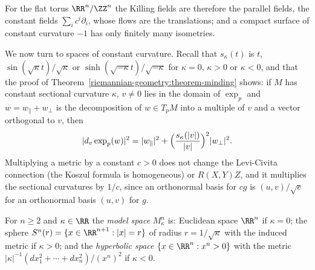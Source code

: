 For the flat torus $\RR^n/\ZZ^n$ the Killing fields are therefore the parallel fields, the constant fields $\sum_ic^i\partial_i$, whose flows are the translations; and a
compact surface of constant curvature $-1$ has only finitely many isometries.

We now turn to spaces of constant curvature. Recall that $s_\kappa(t)$ is $t$, $\sin(\sqrt\kappa t)/\sqrt\kappa$ or $\sinh(\sqrt{-\kappa}t)/\sqrt{-\kappa}$ for
$\kappa = 0$, $\kappa > 0$ or $\kappa < 0$, and that the proof of Theorem~\ref{riemannian-geometry:theorem-minding} shows: if $M$ has constant sectional curvature $\kappa$,
$v \neq 0$ lies in the domain of $\exp_p$ and $w = w_\parallel + w_\perp$ is the decomposition of $w \in T_pM$ into a multiple of $v$ and a vector orthogonal to $v$, then
\begin{equation}\label{riemannian-geometry:equation-exp-constant-curvature}
|d_v\exp_p(w)|^2 = |w_\parallel|^2 + \Bigl(\frac{s_\kappa(|v|)}{|v|}\Bigr)^2|w_\perp|^2.
\end{equation}
Multiplying a metric by a constant $c > 0$ does not change the Levi-Civita connection (the Koszul formula is homogeneous) or $R(X, Y)Z$, and it multiplies the
sectional curvatures by $1/c$, since an orthonormal basis for $cg$ is $(u, v)/\sqrt c$ for an orthonormal basis $(u, v)$ for $g$.

\begin{definition}\label{riemannian-geometry:definition-model-spaces}
For $n \geq 2$ and $\kappa \in \RR$ the \emph{model space} $M^n_\kappa$ is: Euclidean space $\RR^n$ if $\kappa = 0$; the sphere $S^n(r) = \{x \in \RR^{n+1} : |x| = r\}$ of
radius $r = 1/\sqrt\kappa$ with the induced metric if $\kappa > 0$; and the \emph{hyperbolic space} $\{x \in \RR^n : x^n > 0\}$ with the metric
$|\kappa|^{-1}(dx_1^2 + \cdots + dx_n^2)/(x^n)^2$ if $\kappa < 0$.
\end{definition}

